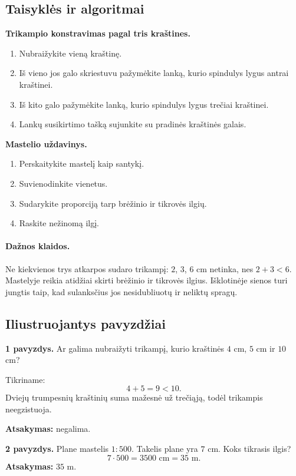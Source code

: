 \subsection{Taisyklės ir algoritmai}
\textbf{Trikampio konstravimas pagal tris kraštines.}
\begin{enumerate}[label=\arabic*.]
\item Nubraižykite vieną kraštinę.
\item Iš vieno jos galo skriestuvu pažymėkite lanką, kurio spindulys lygus antrai kraštinei.
\item Iš kito galo pažymėkite lanką, kurio spindulys lygus trečiai kraštinei.
\item Lankų susikirtimo tašką sujunkite su pradinės kraštinės galais.
\end{enumerate}

\textbf{Mastelio uždavinys.}
\begin{enumerate}[label=\arabic*.]
\item Perskaitykite mastelį kaip santykį.
\item Suvienodinkite vienetus.
\item Sudarykite proporciją tarp brėžinio ir tikrovės ilgių.
\item Raskite nežinomą ilgį.
\end{enumerate}

\paragraph{Dažnos klaidos.}
Ne kiekvienos trys atkarpos sudaro trikampį: \(2\), \(3\), \(6\) cm netinka, nes \(2+3<6\). Mastelyje reikia atidžiai skirti brėžinio ir tikrovės ilgius. Išklotinėje sienos turi jungtis taip, kad sulanksčius jos nesidubliuotų ir neliktų spragų.

\subsection{Iliustruojantys pavyzdžiai}
\textbf{1 pavyzdys.} Ar galima nubraižyti trikampį, kurio kraštinės \(4\) cm, \(5\) cm ir \(10\) cm?

Tikriname:
\[
4+5=9<10.
\]
Dviejų trumpesnių kraštinių suma mažesnė už trečiąją, todėl trikampis neegzistuoja.

\textbf{Atsakymas:} negalima.

\textbf{2 pavyzdys.} Plane mastelis \(1:500\). Takelis plane yra \(7\) cm. Koks tikrasis ilgis?
\[
7\cdot 500=3500\text{ cm}=35\text{ m}.
\]
\textbf{Atsakymas:} \(35\) m.

